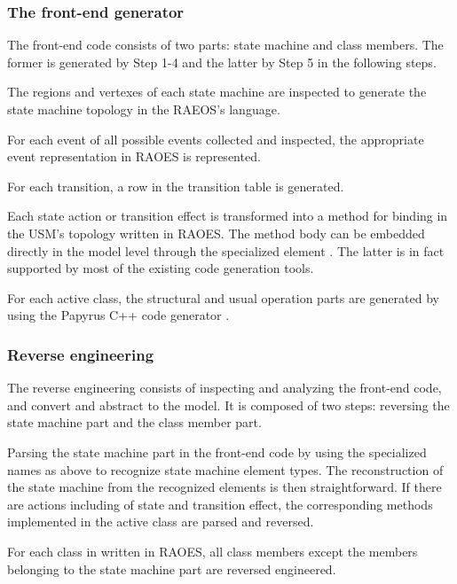 \subsubsection{The front-end generator}
\label{subsubsec:gen}
The front-end code consists of two parts: state machine and class members.
The former is generated by Step 1-4 and the latter by Step 5 in the following steps.
\begin{description}[\footnotesize]
	\item[Step 1] %
	The regions and vertexes of each state machine %
	are inspected to generate the state machine topology in the RAEOS's language. 
	
	\item[Step 2]  
	For each event of all possible events collected and inspected, the appropriate event representation in RAOES is represented.
	
	\item[Step 3] For each transition, a row in the transition table is generated.
	
	\item[Step 4] Each state action or transition effect is transformed into a method%
	for binding in the USM's topology written in RAOES. 
	The method body can be embedded directly in the model level through the specialized element . 
	The latter is in fact supported by most of the existing code generation tools.
	
	\item[Step 5] For each active class, the structural and usual operation parts are generated by using the Papyrus C++ code generator \cite{_papyrus/designer/code-generation_????}. 
\end{description}

\noindent
\subsubsection{Reverse engineering}
\label{subsubsec:reverse}
The reverse engineering consists of inspecting and analyzing the front-end code, and convert and abstract to the model. 
It is composed of two steps: reversing the state machine part and the class member part.

\begin{description}[\footnotesize]
	\item[Step 1] Parsing the state machine part in the front-end code by using the specialized names as above to recognize state machine element types.
	The reconstruction of the state machine from the recognized elements is then straightforward.
	If there are actions including  of state and transition effect, the corresponding methods implemented in the active class are parsed and reversed.
	
	\item[Step 2] For each class in written in RAOES, all class members except the members belonging to the state machine part are reversed engineered.
\end{description}


